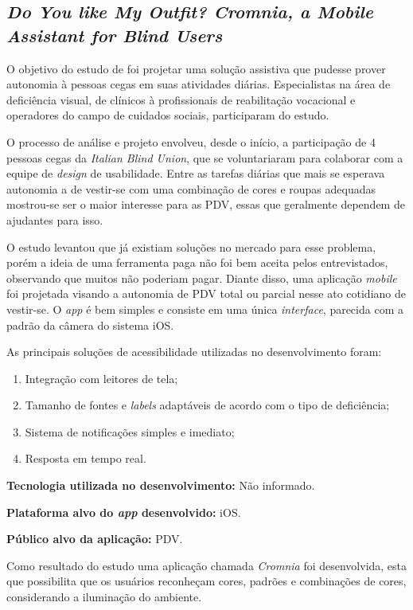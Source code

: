 \subsection{\emph{Do You like My Outfit? Cromnia, a Mobile Assistant for Blind Users}}

O objetivo do estudo de  foi projetar uma solução assistiva que pudesse prover autonomia à pessoas cegas em suas atividades diárias.
Especialistas na área de deficiência visual, de clínicos à profissionais de reabilitação vocacional e operadores do campo de cuidados sociais, participaram do estudo.

O processo de análise e projeto envolveu, desde o início, a participação de 4 pessoas cegas da \emph{Italian Blind Union}, que se voluntariaram para colaborar com a equipe de \emph{design} de usabilidade.
Entre as tarefas diárias que mais se esperava autonomia a de vestir-se com uma combinação de cores e roupas adequadas mostrou-se ser o maior interesse para as PDV, essas que geralmente dependem de ajudantes para isso.

O estudo levantou que já existiam soluções no mercado para esse problema, porém a ideia de uma ferramenta paga não foi bem aceita
pelos entrevistados, observando que muitos não poderiam pagar.
Diante disso, uma aplicação \emph{mobile} foi projetada visando a autonomia de PDV total ou parcial nesse ato cotidiano de vestir-se.
O \emph{app} é bem simples e consiste em uma única \emph{interface}, parecida com a padrão da câmera do sistema iOS\@.

As principais soluções de acessibilidade utilizadas no desenvolvimento foram:

\begin{enumerate}
    \item Integração com leitores de tela;
    \item Tamanho de fontes e \emph{labels} adaptáveis de acordo com o tipo de deficiência;
    \item Sistema de notificações simples e imediato;
    \item Resposta em tempo real.
\end{enumerate}

\textbf{Tecnologia utilizada no desenvolvimento:} Não informado.

\textbf{Plataforma alvo do \emph{app} desenvolvido:} iOS.

\textbf{Público alvo da aplicação:} PDV\@.

Como resultado do estudo uma aplicação chamada \emph{Cromnia} foi desenvolvida, esta que possibilita que os usuários reconheçam
cores, padrões e combinações de cores, considerando a iluminação do ambiente.

